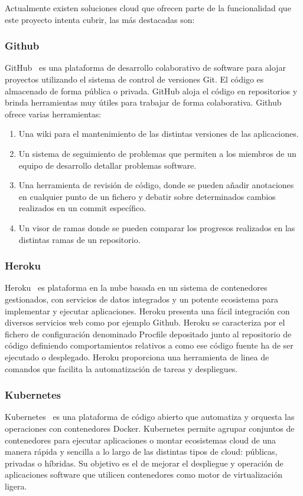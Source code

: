 \documentclass[a4paper,11pt]{book}
\begin{document}
Actualmente existen soluciones cloud que ofrecen parte de la funcionalidad que este proyecto intenta cubrir, las más destacadas son: 


\subsubsection{Github}

GitHub~\cite{github} es una plataforma de desarrollo colaborativo de software para alojar proyectos utilizando el sistema de control de versiones Git. El código es almacenado de forma pública o privada. GitHub aloja el código en repositorios y brinda herramientas muy útiles para trabajar de forma colaborativa. Github~\cite{github2} ofrece varias herramientas:

\begin{enumerate}
\item Una wiki para el mantenimiento de las distintas versiones de las aplicaciones.
\item Un sistema de seguimiento de problemas que permiten a los miembros de un equipo de desarrollo detallar problemas software.
\item Una herramienta de revisión de código, donde se pueden añadir anotaciones en cualquier punto de un fichero y debatir sobre determinados cambios realizados en un commit específico.
\item Un visor de ramas donde se pueden comparar los progresos realizados en las distintas ramas de un repositorio.
\end{enumerate}

\subsubsection{Heroku}

Heroku~\cite{hero} es  plataforma en la nube basada en un sistema de contenedores gestionados, con servicios de datos integrados y un potente ecosistema para implementar y ejecutar aplicaciones. Heroku presenta una fácil integración con diversos servicios web como por ejemplo Github. Heroku se caracteriza por el fichero de configuración denominado Procfile depositado junto al repositorio de código definiendo comportamientos relativos a como ese código fuente ha de ser ejecutado o desplegado.  Heroku proporciona una herramienta de linea de comandos que facilita la automatización de tareas y despliegues.

\subsubsection{Kubernetes}
Kubernetes~\cite{kube} es una plataforma de código abierto que automatiza y orquesta las operaciones con contenedores Docker. Kubernetes permite agrupar conjuntos de contenedores para ejecutar aplicaciones o montar ecosistemas cloud de una manera rápida y sencilla a lo largo de las distintas tipos de cloud: públicas, privadas o híbridas. Su objetivo es el de mejorar el despliegue y operación de aplicaciones software que utilicen contenedores como motor de virtualización ligera.  
\end{document}
